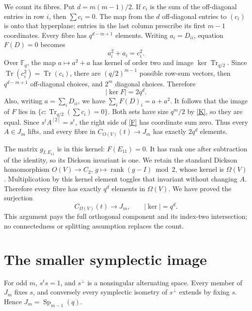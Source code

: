 \documentclass[11pt]{article}
\newcommand{\F}{\mathbb F}\newcommand{\Sp}{\operatorname{Sp}}\newcommand{\diag}{\operatorname{diag}}\newcommand{\Tr}{\operatorname{Tr}}\newcommand{\Om}{\Omega}
\begin{document}
We count its fibres. Put $d=m(m-1)/2$. If $c_i$ is the sum of the
off-diagonal entries in row $i$, then $\sum c_i=0$. The map from the
$d$ off-diagonal entries to $(c_i)$ is onto that hyperplane: entries in
the last column prescribe its first $m-1$ coordinates. Every fibre has
$q^{d-m+1}$ elements.
Writing $a_i=D_{ii}$, equation $F(D)=0$ becomes
\[
                       a_i^2+a_i=c_i^2.
\]
Over $\F_q$, the map $a\mapsto a^2+a$ has kernel of order two and image
$\ker\Tr_{q/2}$. Since $\Tr(c_i^2)=\Tr(c_i)$, there are
$(q/2)^{m-1}$ possible row-sum vectors, then $q^{d-m+1}$ off-diagonal
choices, and $2^m$ diagonal choices. Therefore
\begin{equation}\label{K}
                         |\ker F|=2q^d.
\end{equation}
Also, writing $a=\sum_iD_{ii}$, we have
$\sum_iF(D)_i=a+a^2$. It follows that the image of $F$ lies in
$\{c:\Tr_{q/2}(\sum c_i)=0\}$. Both sets have size $q^m/2$ by
\eqref{K}, so they are equal. Since $s^tA^{[2]}=s^t$, the right side
of \eqref{F} has coordinate sum zero. Thus every $A\in J_m$ lifts,
and every fibre in $C_{O(V)}(t)\to J_m$ has exactly $2q^d$ elements.

The matrix $g_{I,E_{11}}$ is in this kernel: $F(E_{11})=0$.
It has rank one after subtraction of the identity, so its Dickson
invariant is one. We retain the standard Dickson homomorphism
$O(V)\to C_2$, $g\mapsto\operatorname{rank}(g-I)\bmod2$, whose kernel
is $\Om(V)$. Multiplication by this kernel element toggles that invariant
without changing $A$. Therefore every fibre has exactly $q^d$ elements
in $\Om(V)$. We have proved the surjection
\begin{equation}\label{surjection}
 C_{\Om(V)}(t)\longrightarrow J_m,\qquad |\ker|=q^d.
\end{equation}
This argument pays the full orthogonal component and its index-two
intersection; no connectedness or splitting assumption replaces the count.

\section{The smaller symplectic image}
For odd $m$, $s^ts=1$, and $s^\perp$ is a nonsingular alternating space.
Every member of $J_m$ fixes $s$, and conversely every symplectic isometry
of $s^\perp$ extends by fixing $s$. Hence $J_m=\Sp_{m-1}(q)$.
\end{document}
